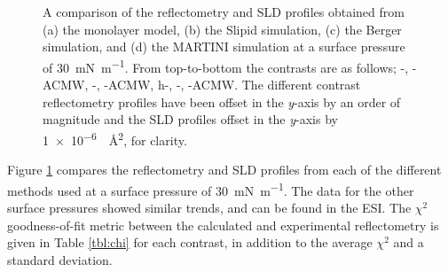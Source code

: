 \documentclass[amsmath,amssymb,twocolumn,superscriptaddress]{revtex4-1}
\begin{document}
\begin{figure}
 \caption{A comparison of the reflectometry and SLD profiles obtained from
 (a) the monolayer model, (b) the Slipid simulation, (c) the Berger
 simulation, and (d) the MARTINI simulation at a surface pressure of
 \SI{30}{\milli\newton\per\meter}. From top-to-bottom the contrasts are as
 follows; -, -ACMW, -,
 -ACMW, h-, -, -ACMW.
 The different contrast reflectometry profiles have been offset in the
 \emph{y}-axis by an order of magnitude and the SLD profiles offset in
 the \emph{y}-axis by \SI{1e-6}{\per\square\angstrom}, for clarity.}
 \label{fig:ref}
\end{figure}
%
Figure \ref{fig:ref} compares the reflectometry and SLD profiles from each
of the different methods used at a surface pressure of
\SI{30}{\milli\newton\per\meter}.
The data for the other surface pressures showed similar trends, and can be
found in the ESI.
The $\chi^2$ goodness-of-fit metric between the calculated and experimental
reflectometry is given in Table \ref{tbl:chi} for each contrast, in addition
to the average $\chi^2$ and a standard deviation.
%
\end{document}
